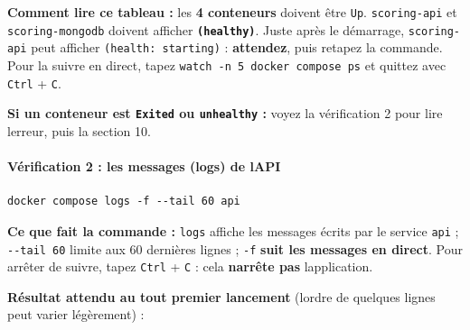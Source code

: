 \documentclass[
  french,
  11pt,
  a4paper,
]{article}
\begin{document}
\textbf{Comment lire ce tableau :} les \textbf{4 conteneurs} doivent
être \texttt{Up}. \texttt{scoring-api} et
\texttt{scoring-\allowbreak{}mongodb} doivent afficher
\textbf{\texttt{(healthy)}}. Juste après le démarrage,
\texttt{scoring-api} peut afficher \texttt{(health:\ starting)} :
\textbf{attendez}, puis retapez la commande. Pour la suivre en direct,
tapez \texttt{watch\ -\allowbreak{}n\ 5\ docker\ compose\ ps} et quittez
avec \texttt{Ctrl} + \texttt{C}.

\textbf{Si un conteneur est \texttt{Exited} ou \texttt{unhealthy} :}
voyez la vérification 2 pour lire l\textquotesingle erreur, puis la
section 10.

\paragraph{Vérification 2 : les messages (logs) de
l\textquotesingle API}\label{vuxe9rification-2--les-messages-logs-de-lapi}

\begin{Verbatim}[breaklines=true,breakanywhere=true,fontsize=\small,frame=leftline,framerule=1.6pt,rulecolor=\color{credixblue},framesep=3mm,xleftmargin=2mm,xrightmargin=1mm]
docker compose logs -f --tail 60 api
\end{Verbatim}

\textbf{Ce que fait la commande :} \texttt{logs} affiche les messages
écrits par le service \texttt{api} ; \texttt{-\/-tail\ 60} limite aux 60
dernières lignes ; \texttt{-f} \textbf{suit les messages en direct}.
Pour arrêter de suivre, tapez \texttt{Ctrl} + \texttt{C} : cela
\textbf{n\textquotesingle arrête pas} l\textquotesingle application.

\textbf{Résultat attendu au tout premier lancement}
(l\textquotesingle ordre de quelques lignes peut varier légèrement) :
\end{document}
